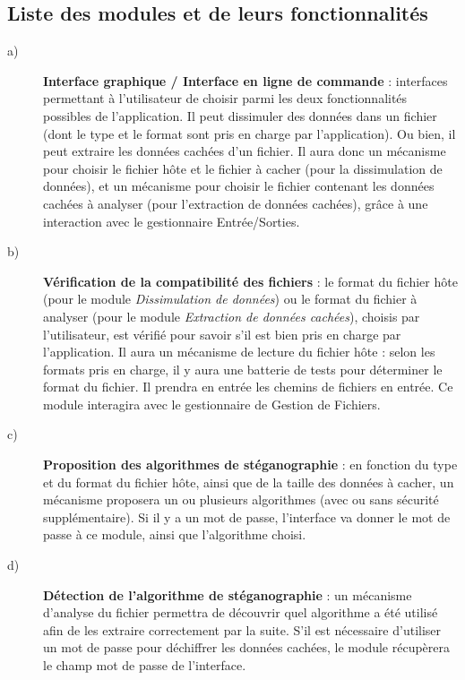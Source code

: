 \documentclass[11pt]{article}
\begin{document}
\subsection{Liste des modules et de leurs fonctionnalités}

\begin{description}
\item[a)] \textbf{Interface graphique / Interface en ligne de commande} :
    interfaces permettant à l'utilisateur de choisir parmi les deux
    fonctionnalités possibles de l'application. Il peut dissimuler des
    données dans un fichier (dont le type et le format sont pris en charge
    par l'application). Ou bien, il peut extraire les données cachées d'un
    fichier. \newline
    Il aura donc un mécanisme pour choisir le fichier hôte et le fichier 
    à cacher (pour la dissimulation de données), et un mécanisme pour choisir le 
    fichier contenant les données cachées à analyser (pour l'extraction de 
    données cachées), grâce à une interaction avec le gestionnaire Entrée/Sorties. 

\item[b)] \textbf{Vérification de la compatibilité des fichiers} : le format 
	du fichier hôte (pour le module \textit{Dissimulation de données}) ou 
	le format du fichier à analyser (pour le module \textit{Extraction de données 
	cachées}), choisis par l'utilisateur, est vérifié pour savoir s'il est 
	bien pris en charge par l'application. \newline
	Il aura un mécanisme de lecture du fichier hôte : selon les formats 
	pris en charge, il y aura une batterie de tests pour déterminer le 
	format du fichier. 
	Il prendra en entrée les chemins de fichiers en entrée. Ce module interagira
	avec le gestionnaire de Gestion de Fichiers. 

\item[c)] \textbf{Proposition des algorithmes de stéganographie} : en fonction
    du type et du format du fichier hôte, ainsi que de la taille des données à
    cacher, un mécanisme proposera un ou plusieurs algorithmes (avec ou sans 
    sécurité supplémentaire). Si il y a un mot de passe, l'interface va 
    donner le mot de passe à ce module, ainsi que l'algorithme choisi. 

\item[d)] \textbf{Détection de l'algorithme de stéganographie} : un mécanisme 
	d'analyse du fichier permettra de découvrir quel algorithme a été utilisé 
	afin de les extraire correctement par la suite. S'il est nécessaire 
	d'utiliser un mot de passe pour déchiffrer les données cachées, le module 
	récupèrera le champ mot de passe de l'interface. 


\end{description}
\end{document}
